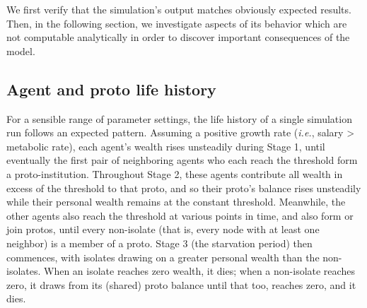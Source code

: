 
We first verify that the simulation's output matches obviously expected
results. Then, in the following section, we investigate aspects of its behavior
which are not computable analytically in order to discover important
consequences of the model.


\subsection{Agent and proto life history}

For a sensible range of parameter settings, the life history of a single
simulation run follows an expected pattern. Assuming a positive growth rate
(\textit{i.e.}, salary > metabolic rate), each agent's wealth rises unsteadily
during Stage 1, until eventually the first pair of neighboring agents who each
reach the threshold form a proto-institution. Throughout Stage 2, these agents
contribute all wealth in excess of the threshold to that proto, and so their
proto's balance rises unsteadily while their personal wealth remains at the
constant threshold. Meanwhile, the other agents also reach the threshold at
various points in time, and also form or join protos, until every non-isolate
(that is, every node with at least one neighbor) is a member of a proto. Stage
3 (the starvation period) then commences, with isolates drawing on a greater
personal wealth than the non-isolates. When an isolate reaches zero wealth, it
dies; when a non-isolate reaches zero, it draws from its (shared) proto balance
until that too, reaches zero, and it dies.

